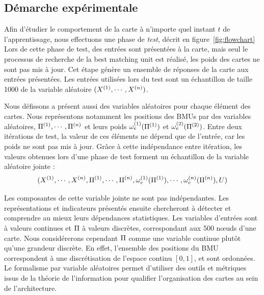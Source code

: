 \subsection{Démarche expérimentale}

Afin d'étudier le comportement de la carte à n'importe quel instant $t$ de l'apprentissage, nous effectuons une phase de \emph{test}, décrit en figure~\ref{fig:flowchart}
Lors de cette phase de test, des entrées sont présentées à la carte, mais seul le processus de recherche de la best matching unit est réalisé, les poids des cartes ne sont pas mis à jour. Cet étape génère un ensemble de réponses de la carte aux entrées présentées.
Les entrées utilisées lors du test sont un échantillon de taille 1000 de la variable aléatoire $(X^{({1})}, \cdots, X^{({n})})$.

Nous défissons a présent aussi des variables aléatoires pour chaque élément des cartes.
Nous représentons notamment les positions des BMUs par des variables aléatoires, $\Pi^{({1})}, \cdots, \Pi^{({n})}$ et leurs poids $\omega_{e}^{({1})}(\Pi^{({1})})$ et $\omega_{e}^{({2})}(\Pi^{({2})})$. 
Entre deux itérations de test, la valeur de ces éléments ne dépend que de l'entrée, car les poids ne sont pas mis à jour. Grâce à cette indépendance entre itération, les valeurs obtenues lors d'une phase de test forment un échantillon de la variable aléatoire jointe : 
$$(X^{({1})}, \cdots, X^{({n})}, \Pi^{({1})}, \cdots, \Pi^{({n})}, \omega_e^{({1})}(\Pi^{({1})}), \cdots, \omega_e^{({n})}(\Pi^{({n})}), U)$$

Les composantes de cette variable jointe ne sont pas indépendantes. Les représentations et indicateurs présentés ensuite chercheront à détecter et comprendre au mieux leurs dépendances statistiques.
Les variables d'entrées sont à valeurs continues et $\Pi$ à valeurs discrètes, correspondant aux 500 n\oe{}uds d'une carte. Nous considérerons cependant $\Pi$ comme une variable continue plutôt qu'une grandeur discrète. En effet, l'ensemble des positions du BMU correspondent à une discrétisation de l'espace continu $[0,1]$, et sont ordonnées.
Le formalisme par variable aléatoires permet d'utiliser des outils et métriques issus de la théorie de l'information pour qualifier l'organisation des cartes au sein de l'architecture.

